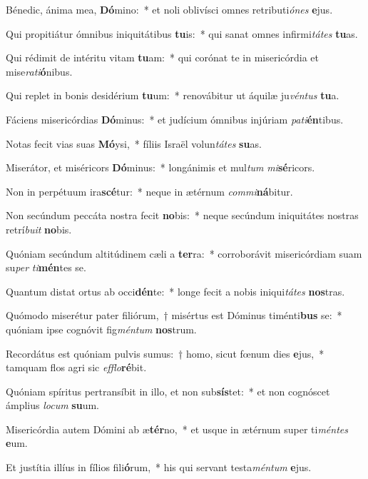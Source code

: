 \item Bénedic, ánima mea, \textbf{Dó}mino:~* et noli oblivísci omnes retributi\textit{ó}\textit{nes} \textbf{e}jus.
\item Qui propitiátur ómnibus iniquitátibus \textbf{tu}is:~* qui sanat omnes infirmi\textit{tá}\textit{tes} \textbf{tu}as.
\item Qui rédimit de intéritu vitam \textbf{tu}am:~* qui corónat te in misericórdia et mise\textit{ra}\textit{ti}\textbf{ó}nibus.
\item Qui replet in bonis desidérium \textbf{tu}um:~* renovábitur ut áquilæ ju\textit{vén}\textit{tus} \textbf{tu}a.
\item Fáciens misericórdias \textbf{Dó}minus:~* et judícium ómnibus injúriam \textit{pa}\textit{ti}\textbf{én}tibus.
\item Notas fecit vias suas \textbf{Mó}ysi,~* fíliis Israël volun\textit{tá}\textit{tes} \textbf{su}as.
\item Miserátor, et miséricors \textbf{Dó}minus:~* longánimis et mul\textit{tum} \textit{mi}\textbf{sé}ricors.
\item Non in perpétuum ira\textbf{scé}tur:~* neque in ætérnum \textit{com}\textit{mi}\textbf{ná}bitur.
\item Non secúndum peccáta nostra fecit \textbf{no}bis:~* neque secúndum iniquitátes nostras retrí\textit{bu}\textit{it} \textbf{no}bis.
\item Quóniam secúndum altitúdinem cæli a \textbf{ter}ra:~* corroborávit misericórdiam suam su\textit{per} \textit{ti}\textbf{mén}tes se.
\item Quantum distat ortus ab occi\textbf{dén}te:~* longe fecit a nobis iniqui\textit{tá}\textit{tes} \textbf{nos}tras.
\item Quómodo miserétur pater filiórum,~† misértus est Dóminus timénti\textbf{bus} se:~* quóniam ipse cognóvit fig\textit{mén}\textit{tum} \textbf{nos}trum.
\item Recordátus est quóniam pulvis sumus:~† homo, sicut fœnum dies \textbf{e}jus,~* tamquam flos agri sic \textit{ef}\textit{flo}\textbf{ré}bit.
\item Quóniam spíritus pertransíbit in illo, et non sub\textbf{sís}tet:~* et non cognóscet ámplius \textit{lo}\textit{cum} \textbf{su}um.
\item Misericórdia autem Dómini ab æ\textbf{tér}no,~* et usque in ætérnum super ti\textit{mén}\textit{tes} \textbf{e}um.
\item Et justítia illíus in fílios fili\textbf{ó}rum,~* his qui servant testa\textit{mén}\textit{tum} \textbf{e}jus.
